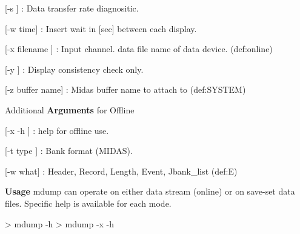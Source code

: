 \begin{DoxyItemize}
\item \mbox{[}-\/s \mbox{]} : Data transfer rate diagnositic.
\item \mbox{[}-\/w time\mbox{]} : Insert wait in \mbox{[}sec\mbox{]} between each display.
\item \mbox{[}-\/x filename \mbox{]} : Input channel. data file name of data device. (def:online)
\item \mbox{[}-\/y \mbox{]} : Display consistency check only.
\item \mbox{[}-\/z buffer name\mbox{]} : Midas buffer name to attach to (def:SYSTEM)
\end{DoxyItemize}


\begin{DoxyItemize}
\item Additional {\bfseries  Arguments } for Offline
\begin{DoxyItemize}
\item \mbox{[}-\/x -\/h \mbox{]} : help for offline use.
\item \mbox{[}-\/t type \mbox{]} : Bank format (MIDAS).
\item \mbox{[}-\/w what\mbox{]} : Header, Record, Length, Event, Jbank\_\-list (def:E)
\end{DoxyItemize}
\end{DoxyItemize}


\begin{DoxyItemize}
\item {\bfseries  Usage } mdump can operate on either data stream (online) or on save-\/set data files. Specific help is available for each mode. 
\begin{DoxyCode}
 > mdump -h
 > mdump -x -h
\end{DoxyCode}

\end{DoxyItemize}

\par


